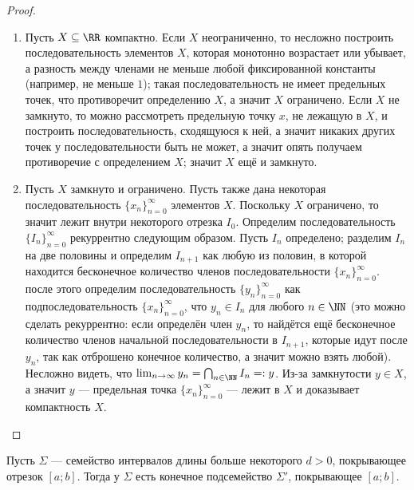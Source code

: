 \documentclass[12pt,a4paper]{article}
\begin{document}
    \begin{proof}\ 
        \begin{enumerate}
            \item Пусть $X \subseteq \RR$ компактно. Если $X$ неограниченно, то несложно построить последовательность элементов $X$, которая монотонно возрастает или убывает, а разность между членами не меньше любой фиксированной константы (например, не меньше $1$); такая последовательность не имеет предельных точек, что противоречит определению $X$, а значит $X$ ограничено. Если $X$ не замкнуто, то можно рассмотреть предельную точку $x$, не лежащую в $X$, и построить последовательность, сходящуюся к ней, а значит никаких других точек у последовательности быть не может, а значит опять получаем противоречие с определением $X$; значит $X$ ещё и замкнуто.
            \item Пусть $X$ замкнуто и ограничено. Пусть также дана некоторая последовательность $\{x_n\}_{n=0}^\infty$ элементов $X$. Поскольку $X$ ограничено, то значит лежит внутри некоторого отрезка $I_0$. Определим последовательность $\{I_n\}_{n=0}^\infty$ рекуррентно следующим образом. Пусть $I_n$ определено; разделим $I_n$ на две половины и определим $I_{n+1}$ как любую из половин, в которой находится бесконечное количество членов последовательности $\{x_n\}_{n=0}^\infty$. после этого определим последовательность $\{y_n\}_{n=0}^\infty$ как подпоследовательность $\{x_n\}_{n=0}^\infty$, что $y_n \in I_n$ для любого $n \in \NN$ (это можно сделать рекуррентно: если определён член $y_n$, то найдётся ещё бесконечное количество членов начальной последовательности в $I_{n+1}$, которые идут после $y_n$, так как отброшено конечное количество, а значит можно взять любой). Несложно видеть, что $\lim_{n \to \infty} y_n = \bigcap_{n \in \NN} I_n =: y$. Из-за замкнутости $y \in X$, а значит $y$ --- предельная точка $\{x_n\}_{n=0}^\infty$ --- лежит в $X$ и доказывает компактность $X$.
        \end{enumerate}
    \end{proof}

    \begin{lemma}\label{segment_edged_subcover_great_lemma}
        Пусть $\Sigma$ --- семейство интервалов длины больше некоторого $d > 0$, покрывающее отрезок $[a; b]$. Тогда у $\Sigma$ есть конечное подсемейство $\Sigma'$, покрывающее $[a; b]$.
    \end{lemma}
    
\end{document}
